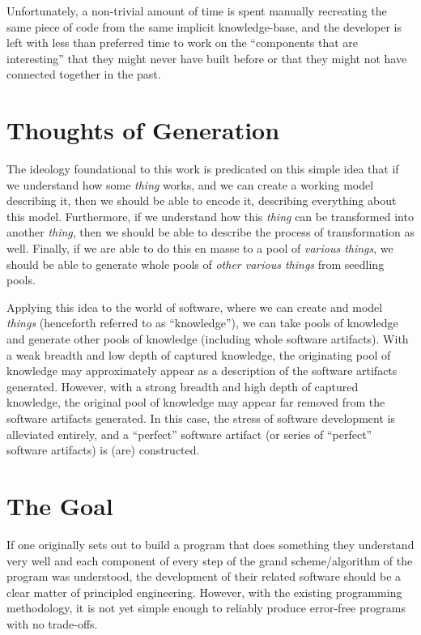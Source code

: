 Unfortunately, a non-trivial amount of time is spent manually recreating the
same piece of code from the same implicit knowledge-base, and the developer is
left with less than preferred time to work on the ``components that are
interesting'' that they might never have built before or that they might not
have connected together in the past.

\section{Thoughts of Generation}

The ideology foundational to this work is predicated on this simple idea that if
we understand how some \textit{thing} works, and we can create a working model
describing it, then we should be able to encode it, describing everything about
this model. Furthermore, if we understand how this \textit{thing} can be
transformed into another \textit{thing}, then we should be able to describe the
process of transformation as well. Finally, if we are able to do this en masse
to a pool of \textit{various things}, we should be able to generate whole pools
of \textit{other various things} from seedling pools.

Applying this idea to the world of software, where we can create and model
\textit{things} (henceforth referred to as ``knowledge''), we can take pools of
knowledge and generate other pools of knowledge (including whole software
artifacts). With a weak breadth and low depth of captured knowledge, the
originating pool of knowledge may approximately appear as a description of the
software artifacts generated. However, with a strong breadth and high depth of
captured knowledge, the original pool of knowledge may appear far removed from
the software artifacts generated. In this case, the stress of software
development is alleviated entirely, and a ``perfect'' software artifact (or
series of ``perfect'' software artifacts) is (are) constructed.

\section{The Goal}

If one originally sets out to build a program that does something they
understand very well and each component of every step of the grand
scheme/algorithm of the program was understood, the development of their related
software should be a clear matter of principled engineering. However, with the
existing programming methodology, it is not yet simple enough to reliably
produce error-free programs with no trade-offs.


